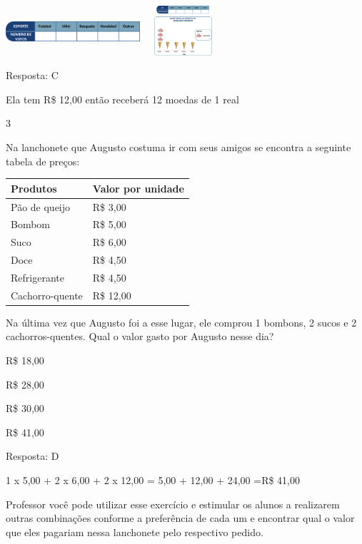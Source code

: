 \begin{escolha}
\begin{escolha}
\begin{escolha}
\item
\includegraphics[width=1.95850in,height=0.69173in]{media/image85.png}\includegraphics[width=1.26678in,height=0.72506in]{media/image84.png}
\end{escolha}

Resposta: C

Ela tem R\$ 12,00 então receberá 12 moedas de 1 real

\num{3}

Na lanchonete que Augusto costuma ir com seus amigos se encontra a
seguinte tabela de preços:

\begin{longtable}[]{@{}ll@{}}
\toprule
Produtos & Valor por unidade\tabularnewline
\midrule
\endhead
Pão de queijo & R\$ 3,00\tabularnewline
Bombom & R\$ 5,00\tabularnewline
Suco & R\$ 6,00\tabularnewline
Doce & R\$ 4,50\tabularnewline
Refrigerante & R\$ 4,50\tabularnewline
Cachorro-quente & R\$ 12,00\tabularnewline
\bottomrule
\end{longtable}

Na última vez que Augusto foi a esse lugar, ele comprou 1 bombons, 2
sucos e 2 cachorros-quentes. Qual o valor gasto por Augusto nesse dia?

\begin{escolha}

\item
  R\$ 18,00
\item
  R\$ 28,00
\item
  R\$ 30,00
\item
  R\$ 41,00
\end{escolha}

Resposta: D

1 x 5,00 + 2 x 6,00 + 2 x 12,00 = 5,00 + 12,00 + 24,00 =R\$ 41,00

Professor você pode utilizar esse exercício e estimular os alunos a
realizarem outras combinações conforme a preferência de cada um e
encontrar qual o valor que eles pagariam nessa lanchonete pelo
respectivo pedido.

\chapter{}


\end{escolha}
\end{escolha}
